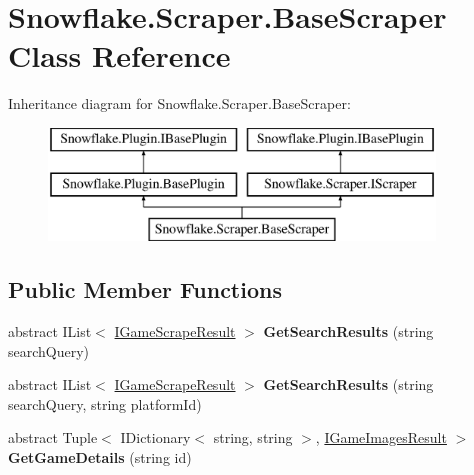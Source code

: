 \hypertarget{class_snowflake_1_1_scraper_1_1_base_scraper}{}\section{Snowflake.\+Scraper.\+Base\+Scraper Class Reference}
\label{class_snowflake_1_1_scraper_1_1_base_scraper}
Inheritance diagram for Snowflake.\+Scraper.\+Base\+Scraper\+:\begin{figure}[H]
\begin{center}
\leavevmode
\includegraphics[height=3.000000cm]{class_snowflake_1_1_scraper_1_1_base_scraper}
\end{center}
\end{figure}
\subsection*{Public Member Functions}
\begin{DoxyCompactItemize}
\item 
\hypertarget{class_snowflake_1_1_scraper_1_1_base_scraper_a5f2dbc39aa8b7d461b95eaebd0ba2492}{}abstract I\+List$<$ \hyperlink{interface_snowflake_1_1_scraper_1_1_i_game_scrape_result}{I\+Game\+Scrape\+Result} $>$ {\bfseries Get\+Search\+Results} (string search\+Query)\label{class_snowflake_1_1_scraper_1_1_base_scraper_a5f2dbc39aa8b7d461b95eaebd0ba2492}

\item 
\hypertarget{class_snowflake_1_1_scraper_1_1_base_scraper_a6527a1d267658a527fae3a742f483706}{}abstract I\+List$<$ \hyperlink{interface_snowflake_1_1_scraper_1_1_i_game_scrape_result}{I\+Game\+Scrape\+Result} $>$ {\bfseries Get\+Search\+Results} (string search\+Query, string platform\+Id)\label{class_snowflake_1_1_scraper_1_1_base_scraper_a6527a1d267658a527fae3a742f483706}

\item 
\hypertarget{class_snowflake_1_1_scraper_1_1_base_scraper_a5ba5abf1678db32ff9f4b9c4eaa79e00}{}abstract Tuple$<$ I\+Dictionary$<$ string, string $>$, \hyperlink{interface_snowflake_1_1_scraper_1_1_i_game_images_result}{I\+Game\+Images\+Result} $>$ {\bfseries Get\+Game\+Details} (string id)\label{class_snowflake_1_1_scraper_1_1_base_scraper_a5ba5abf1678db32ff9f4b9c4eaa79e00}

\end{DoxyCompactItemize}

